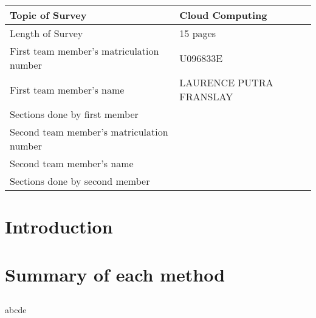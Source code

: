 \documentclass[]{article}
\begin{document}
\begin{table}[here]
\centering
\begin{tabularx}{0.7\textwidth}{| X | X | }
\hline
Topic of Survey						& 	Cloud Computing\\
\hline
Length of Survey						& 	15 pages\\
\hline
First team member's matriculation number	&	U096833E\\
\hline
First team member's name				&	LAURENCE PUTRA FRANSLAY\\
\hline
Sections done by first member				& 	\\
\hline
Second team member's matriculation number	&	\\
\hline
Second team member's name				&	\\
\hline
Sections done by second member			& 	\\
\hline

\hline
\end{tabularx}
\end{table}

\pagebreak

\section{Introduction}

\section{Summary of each method}
\subsection{}

\subsection{}
abcde
\subsection{}

\subsection{}

\subsection{}
\end{document}
